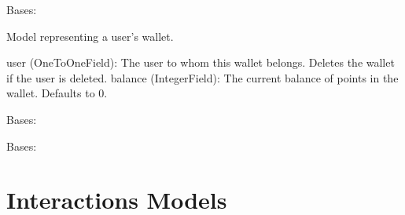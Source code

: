 \documentclass[letterpaper,10pt,english]{sphinxmanual}
\begin{document}

\begin{fulllineitems}
\label{\detokenize{modules/models:finances.models.Wallet}}
\pysigstartsignatures
{}
\pysigstopsignatures
\sphinxAtStartPar
Bases: 

\sphinxAtStartPar
Model representing a user’s wallet.
\begin{description}
\sphinxAtStartPar
user (OneToOneField): The user to whom this wallet belongs. Deletes the wallet if the user is deleted.
balance (IntegerField): The current balance of points in the wallet. Defaults to 0.

\end{description}

\begin{fulllineitems}
\label{\detokenize{modules/models:finances.models.Wallet.DoesNotExist}}
\pysigstartsignatures
{}
\pysigstopsignatures
\sphinxAtStartPar
Bases: 

\end{fulllineitems}


\begin{fulllineitems}
\label{\detokenize{modules/models:finances.models.Wallet.MultipleObjectsReturned}}
\pysigstartsignatures
{}
\pysigstopsignatures
\sphinxAtStartPar
Bases: 

\end{fulllineitems}


\end{fulllineitems}



\section{Interactions Models}
\label{\detokenize{modules/models:module-interactions.models}}\label{\detokenize{modules/models:interactions-models}}
\end{document}
